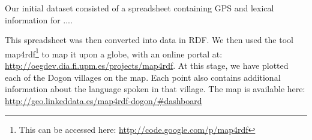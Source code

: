 
Our initial dataset consisted of a spreadsheet containing GPS and lexical information for .... %

This spreadsheet was then converted into data in RDF. We then used the tool map4rdf\footnote{This can be accessed here: \url{http://code.google.com/p/map4rdf}} to map it upon a globe, with an online portal at: \url{http://oegdev.dia.fi.upm.es/projects/map4rdf}. At this stage, we have plotted each of the Dogon villages on the map. Each point also contains additional information about the language spoken in that village. The map is available here: \url{http://geo.linkeddata.es/map4rdf-dogon/#dashboard}


